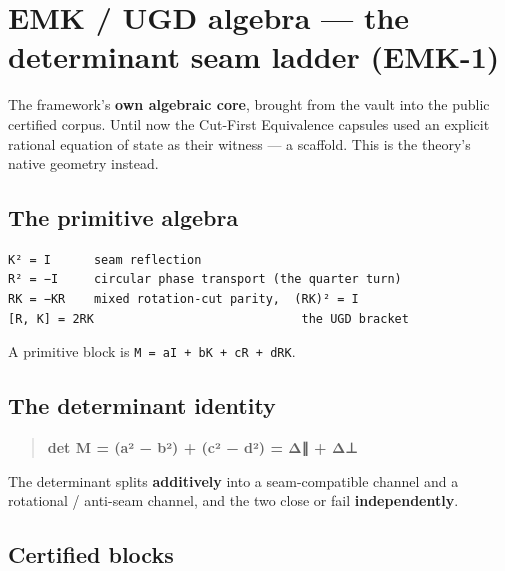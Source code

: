 \hypertarget{emk-ugd-algebra-the-determinant-seam-ladder-emk-1}{%
\chapter{EMK / UGD algebra --- the determinant seam ladder (EMK-1)}\label{emk-ugd-algebra-the-determinant-seam-ladder-emk-1}}

The framework's \textbf{own algebraic core}, brought from the vault into the
public certified corpus. Until now the Cut-First Equivalence capsules
used an explicit rational equation of state as their witness --- a
scaffold. This is the theory's native geometry instead.

\hypertarget{the-primitive-algebra}{%
\section{The primitive algebra}\label{the-primitive-algebra}}

\begin{verbatim}
K² = I      seam reflection
R² = −I     circular phase transport (the quarter turn)
RK = −KR    mixed rotation-cut parity,  (RK)² = I
[R, K] = 2RK                             the UGD bracket
\end{verbatim}

A primitive block is \texttt{M\ =\ aI\ +\ bK\ +\ cR\ +\ dRK}.

\hypertarget{the-determinant-identity}{%
\section{The determinant identity}\label{the-determinant-identity}}

\begin{quote}
\textbf{det M = (a² − b²) + (c² − d²) = Δ∥ + Δ⊥}
\end{quote}

The determinant splits \textbf{additively} into a seam-compatible channel and
a rotational / anti-seam channel, and the two close or fail
\textbf{independently}.

\hypertarget{certified-blocks}{%
\section{Certified blocks}\label{certified-blocks}}

